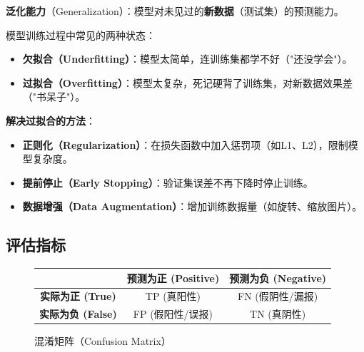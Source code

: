 \begin{conceptbox}
\textbf{泛化能力}（Generalization）：模型对未见过的\textbf{新数据}（测试集）的预测能力。
\end{conceptbox}

模型训练过程中常见的两种状态：
\begin{itemize}[leftmargin=2em,itemsep=0pt]
    \item \textbf{欠拟合（Underfitting）}：模型太简单，连训练集都学不好（"还没学会"）。
    \item \textbf{过拟合（Overfitting）}：模型太复杂，死记硬背了训练集，对新数据效果差（"书呆子"）。
\end{itemize}

\textbf{解决过拟合的方法}：
\begin{itemize}[itemsep=0pt]
    \item \textbf{正则化（Regularization）}：在损失函数中加入惩罚项（如L1、L2），限制模型复杂度。
    \item \textbf{提前停止（Early Stopping）}：验证集误差不再下降时停止训练。
    \item \textbf{数据增强（Data Augmentation）}：增加训练数据量（如旋转、缩放图片）。
\end{itemize}

\subsection{评估指标}

\begin{figure}[htbp]
\centering
\begin{tabular}{|c|c|c|}
\hline
& \textbf{预测为正 (Positive)} & \textbf{预测为负 (Negative)} \\
\hline
\textbf{实际为正 (True)} & TP (真阳性) & FN (假阴性/漏报) \\
\hline
\textbf{实际为负 (False)} & FP (假阳性/误报) & TN (真阴性) \\
\hline
\end{tabular}
\caption{混淆矩阵（Confusion Matrix）}
\end{figure}

